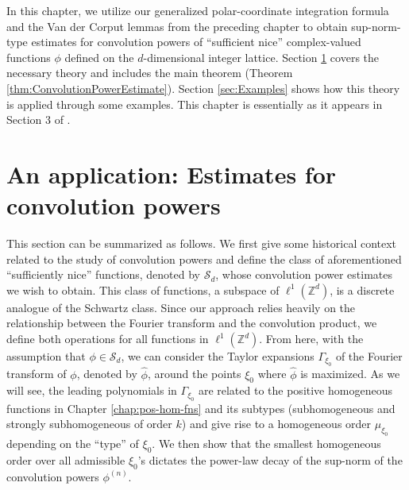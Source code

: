 \documentclass[11pt, letter]{book}
\begin{document}
In this chapter, we utilize our generalized polar-coordinate integration formula and the Van der Corput lemmas from the preceding chapter to obtain sup-norm-type estimates for convolution powers of ``sufficient nice'' complex-valued functions $\phi$ defined on the $d$-dimensional integer lattice. Section \ref{sec:ConvolutionPowers} covers the necessary theory and includes the main theorem (Theorem \ref{thm:ConvolutionPowerEstimate}). Section \ref{sec:Examples} shows how this theory is applied through some examples. This chapter is essentially as it appears in Section 3 of \cite{bui2021generalized}.\\





\section{An application: Estimates for convolution powers}\label{sec:ConvolutionPowers}

This section can be summarized as follows. We first give some historical context related to the study of convolution powers and define the class of aforementioned ``sufficiently nice'' functions, denoted by $\mathcal{S}_d$, whose convolution power estimates we wish to obtain. This class of functions, a subspace of  $\ell^1(\mathbb{Z}^d)$, is a discrete analogue of the Schwartz class. Since our approach relies heavily on the relationship between the Fourier transform and the convolution product, we define both operations for all functions in $\ell^1(\mathbb{Z}^d)$.  From here, with the assumption that $\phi\in\mathcal{S}_d$, we can  consider the Taylor expansions $\Gamma_{\xi_0}$ of the Fourier transform of $\phi$, denoted by $\widehat{\phi}$, around the points $\xi_0$ where $\widehat{\phi}$ is maximized. As we will see, the leading polynomials in $\Gamma_{\xi_0}$ are related to the positive homogeneous functions in Chapter \ref{chap:pos-hom-fns} and its subtypes (subhomogeneous and strongly subhomogeneous of order $k$) and give rise to a homogeneous order $\mu_{\xi_0}$ depending on the ``type'' of $\xi_0$. We then show that the smallest homogeneous order over all admissible $\xi_0$'s dictates the power-law decay of the sup-norm of the convolution powers $\phi^{(n)}$.\\
\end{document}
